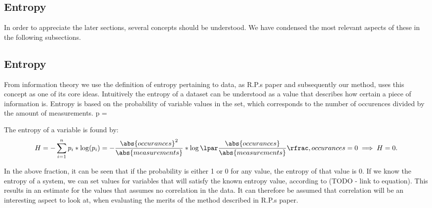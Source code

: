 \subsection{Entropy}

In order to appreciate the later sections, several concepts should be understood.
We have condensed the most relevant aspects of these in the following subsections.

\subsection{Entropy}

From information theory we use the definition of entropy pertaining to data, as R.P.s paper\cite{rasmus}  and subsequently our method, uses this concept as one of its core ideas. Intuitively the entropy of a dataset can be understood as a value that describes how certain a piece of information is. Entropy is based on the probability of variable values in the set, which corresponds to the number of occurences divided by the amount of measurements. p =  

The entropy of a variable is found by:
\begin{equation}
H = - \sum\limits_{i=1}^n p_{i} * \log (p_{i}) = - \frac{\abs{occurances}^2}{\abs{measurements}} * \log\lpar\frac{\abs{occurances}}{\abs{measurements}}\rfrac 
$\\ $
, occurances=0 \implies H=0.
\end{equation}

In the above fraction, it can be seen that if the probability is either 1 or 0 for any value, the entropy of that value is 0. If we know the entropy of a system, we can set values for variables that will satisfy the known entropy value, according to (TODO - link to equation). This results in an estimate for the values that assumes no correlation in the data. It can therefore be assumed that correlation will be an interesting aspect to look at, when evaluating the merits of the method described in R.P.s paper\cite{rasmus}. 

